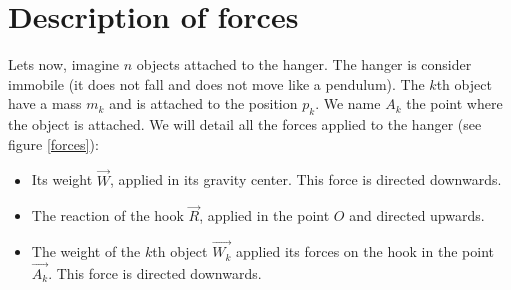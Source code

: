 \documentclass{report}
\begin{document}
\section{Description of forces}

Lets now, imagine $n$ objects attached to the hanger.
The hanger is consider immobile (it does not fall and does not move like a pendulum).
The $k$th object have a mass $m_k$ and is attached to the position $p_k$.
We name $A_k$ the point where the object is attached.
We will detail all the forces applied to the hanger (see figure \ref{forces}):
\begin{itemize}
\item Its weight $\overrightarrow{W}$, applied in its gravity center. This force is directed downwards.
\item The reaction of the hook $\overrightarrow{R}$, applied in the point $O$ and directed upwards.
\item The weight of the $k$th object $\overrightarrow{W_k}$ applied its forces on the hook in the point $\overrightarrow{A_k}$. This force is directed downwards.
\end{itemize}
\end{document}

